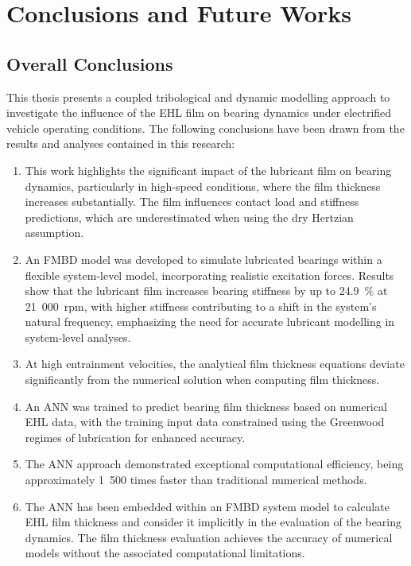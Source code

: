 \chapter{Conclusions and Future Works}
\label{Conclusions}

\section{Overall Conclusions}

This thesis presents a coupled tribological and dynamic modelling approach to investigate the influence of the EHL film on bearing dynamics under electrified vehicle operating conditions. The following conclusions have been drawn from the results and analyses contained in this research:

\begin{enumerate}
	\item This work highlights the significant impact of the lubricant film on bearing dynamics, particularly in high-speed conditions, where the film thickness increases substantially. The film influences contact load and stiffness predictions, which are underestimated when using the dry Hertzian assumption.
	\item An FMBD model was developed to simulate lubricated bearings within a flexible system-level model, incorporating realistic excitation forces. Results show that the lubricant film increases bearing stiffness by up to 24.9~\% at 21~000~rpm, with higher stiffness contributing to a shift in the system’s natural frequency, emphasizing the need for accurate lubricant modelling in system-level analyses.
	\item At high entrainment velocities, the analytical film thickness equations deviate significantly from the numerical solution when computing film thickness.
	\item An ANN was trained to predict bearing film thickness based on numerical EHL data, with the training input data constrained using the Greenwood regimes of lubrication for enhanced accuracy.
	\item The ANN approach demonstrated exceptional computational efficiency, being approximately 1~500 times faster than traditional numerical methods.
	\item The ANN has been embedded within an FMBD system model to calculate EHL film thickness and consider it implicitly in the evaluation of the bearing dynamics. The film thickness evaluation achieves the accuracy of numerical models without the associated computational limitations.
\end{enumerate}


